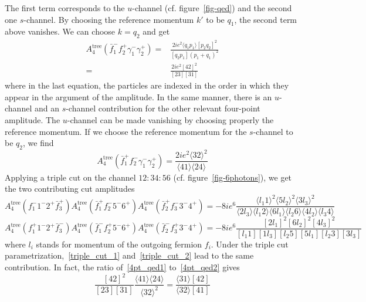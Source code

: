 The first term corresponds to the $u$-channel (cf. figure~\ref{fig-qed}) and the second one $s$-channel.
By choosing the reference momentum $k'$ to be $q_1$, the second term above vanishes. 
We can choose $k = q_2$ and get 
\begin{equation}\label{4pt_qed1}
\begin{split}
A_{4}^{\mathrm{tree}}(\bar{f}_1^- f_2^+ \gamma_1^-\gamma_2^+) 
= &
\frac{2ie^2\langle q_1 p_1 \rangle[p_2 q_2]^2}{[q_2 p_1](p_1+q_1)^2}
\\ 
= &
\frac{2ie^2[42]^2}{[23][31]}
\end{split}
\end{equation}
where in the last equation, the particles are indexed in the order in which they appear in the argument of the amplitude.
In the same manner, there is an $u$-channel and an $s$-channel contribution for the other relevant four-point amplitude. 
The $u$-channel can be made vanishing by choosing properly the reference momentum. 
If we choose the reference momentum for the $s$-channel to be $q_2$, we find 
\begin{equation}\label{4pt_qed2}
A_4^{\mathrm{tree}}(\bar{f}_1^+ f_2^- \gamma_1^- \gamma_2^+) = 
\frac{2ie^2\langle 32\rangle^2}{\langle 41 \rangle\langle 24\rangle}
\end{equation}
Applying a triple cut on the channel $12:34:56$ (cf. figure~\ref{fig-6photons}), we get the two contributing cut amplitudes
\begin{equation}\label{triple_cut_1}
A_{4}^{\mathrm{tree}}(f_1^- 1^-2^+\bar{f}_3^+)
A_4^{\mathrm{tree}}(\bar{f}_1^+f_2^-5^-6^+)
A_4^{\mathrm{tree}}(\bar{f}_2^+ f_3^-3^-4^+)
=
-8ie^6\frac{\langle l_1 1\rangle^2 \langle 5l_2 \rangle^2\langle 3l_3\rangle^2}{\langle2 l_3\rangle\langle l_1 2\rangle\langle 6 l_1 \rangle\langle l_2 6\rangle\langle 4 l_2\rangle\langle l_3 4\rangle}
\end{equation}
\begin{equation}\label{triple_cut_2}
A_{4}^{\mathrm{tree}}(f_1^+ 1^-2^+\bar{f}_3^-)
A_4^{\mathrm{tree}}(\bar{f}_1^-f_2^+5^-6^+)
A_4^{\mathrm{tree}}(\bar{f}_2^- f_3^+3^-4^+)
=
-8ie^6\frac{[2l_1]^2[6l_2]^2[4l_3]^2}{[l_1 1 ][1l_3][l_2 5][5l_1][l_2 3][3l_3]}
\end{equation}
where $l_i$ stands for momentum of the outgoing fermion $f_i$.
Under the triple cut parametrization,~\cref{triple_cut_1} and~\cref{triple_cut_2} lead to the same contribution. 
In fact, the ratio of~\cref{4pt_qed1} to~\cref{4pt_qed2} gives
\begin{equation*}
\frac{[42]^2}{[23][31]}\frac{\langle 41\rangle\langle 24\rangle}{\langle 32 \rangle^2} = \frac{\langle 31\rangle[42]}{\langle 32 \rangle[41]} 
\end{equation*} 
